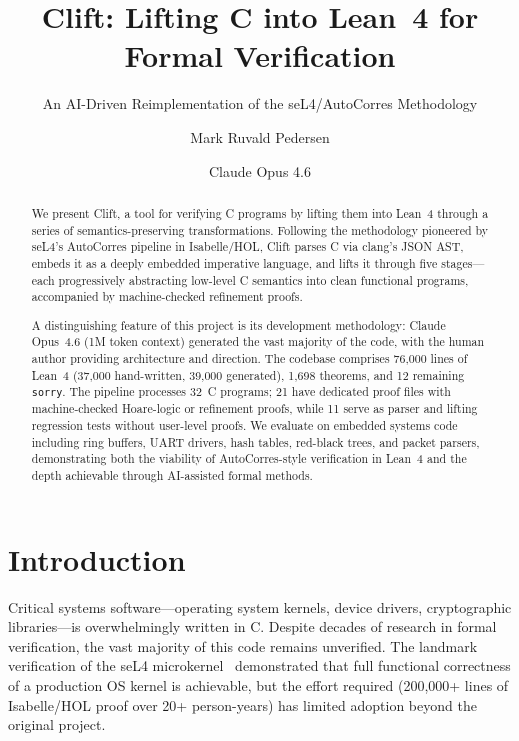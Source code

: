 \documentclass[sigconf,nonacm,screen]{acmart}
\title{Clift: Lifting C into Lean~4 for Formal Verification}
\subtitle{An AI-Driven Reimplementation of the seL4/AutoCorres Methodology}
\author{Mark Ruvald Pedersen}
\affiliation{%
  \institution{Independent Researcher}
  \city{Copenhagen}
  \country{Denmark}
}
\author{Claude Opus 4.6}
\affiliation{%
  \institution{Anthropic}
  \city{San Francisco}
  \country{USA}
}
\begin{document}
\begin{abstract}
We present Clift, a tool for verifying C programs by lifting them into
Lean~4 through a series of semantics-preserving transformations.
Following the methodology pioneered by seL4's AutoCorres pipeline in
Isabelle/HOL, Clift parses C via clang's JSON AST, embeds it as a
deeply embedded imperative language, and lifts it through five
stages---each progressively abstracting low-level C semantics into
clean functional programs, accompanied by machine-checked refinement
proofs.

A distinguishing feature of this project is its development
methodology: Claude Opus~4.6 (1M token context) generated the vast
majority of the code, with the human author providing architecture
and direction. The codebase comprises
76,000 lines of Lean~4 (37,000 hand-written, 39,000 generated),
1,698 theorems, and 12 remaining \texttt{sorry}.
The pipeline processes 32~C programs; 21 have dedicated proof files
with machine-checked Hoare-logic or refinement proofs, while 11 serve
as parser and lifting regression tests without user-level proofs.
We evaluate on embedded systems code including ring buffers, UART drivers,
hash tables, red-black trees, and packet parsers, demonstrating both
the viability of AutoCorres-style verification in Lean~4 and the
depth achievable through AI-assisted formal methods.
\end{abstract}


\maketitle

\section{Introduction}

Critical systems software---operating system kernels, device drivers,
cryptographic libraries---is overwhelmingly written in C. Despite
decades of research in formal verification, the vast majority of this
code remains unverified. The landmark verification of the seL4
microkernel~\cite{klein2009sel4} demonstrated that full functional
correctness of a production OS kernel is achievable, but the effort
required (200,000+ lines of Isabelle/HOL proof over 20+
person-years) has limited adoption beyond the original project.
\end{document}
